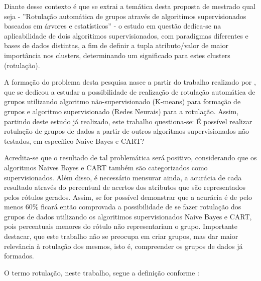 Diante desse contexto é que se extrai a temática desta proposta de mestrado qual seja - ''Rotulação automática de grupos através de algoritimos supervisionados baseados em árvores e estatísticos'' - o estudo em questão dedica-se na aplicabilidade de dois algoritimos supervisionados, com paradigmas diferentes e bases de dados distintas, a fim de  definir a tupla atributo/valor de maior importância nos clusters, determinando um significado para estes clusters (rotulação).


A formação do problema desta pesquisa nasce a partir do trabalho realizado por ,  que se dedicou a estudar a possibilidade de realização de  rotulação automática de grupos utilizando  algoritmo não-supervisionado (K-means) para formação de grupos e algoritmo supervisionado (Redes Neurais) para a rotulação. Assim, partindo deste estudo já realizado, este trabalho questiona-se:  É possível realizar rotulação de grupos de dados a partir de outros algoritmos supervisionados não testados, em específico Naive Bayes e CART?

Acredita-se que o resultado de tal problemática será positivo, considerando que os algoritmos Naives Bayes e CART também são categorizados como supervisionados. Além disso, é necessário mensurar ainda, a acurácia de cada resultado através do percentual de acertos dos atributos que são representados pelos rótulos gerados. Assim, se for possível demonstrar que a acurácia é de pelo menos 60\% ficará então comprovada a possibilidade de se fazer rotulação dos grupos de dados utilizando os algoritimos supervisionados Naive Bayes e CART, pois percentuais menores do rótulo não representariam o grupo. Importante destacar, que este trabalho não se preocupa em criar grupos, mas dar maior relevância à rotulação dos mesmos, isto é, compreender os grupos de dados já formados.

O termo rotulação, neste trabalho, segue a definição conforme : 

